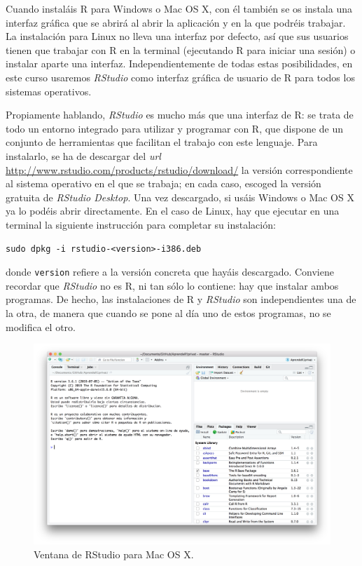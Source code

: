 \documentclass[]{book}
\theoremstyle{definition}
\theoremstyle{definition}
\theoremstyle{definition}
\theoremstyle{remark}
\begin{document}
Cuando instaláis R para Windows o Mac OS X, con él también se os instala una interfaz gráfica que se abrirá al abrir la aplicación y en la que podréis trabajar. La instalación para Linux no lleva una interfaz por defecto, así que sus usuarios tienen que trabajar con R en la terminal (ejecutando R para iniciar una sesión) o instalar aparte una interfaz. Independientemente de todas estas posibilidades, en este curso usaremos \emph{RStudio} como interfaz gráfica de usuario de R para todos los sistemas operativos.

Propiamente hablando, \emph{RStudio} es mucho más que una interfaz de R: se trata de todo un entorno integrado para utilizar y programar con R, que dispone de un conjunto de herramientas que facilitan el trabajo con este lenguaje. Para instalarlo, se ha de descargar del \emph{url} \url{http://www.rstudio.com/products/rstudio/download/} la versión correspondiente al sistema operativo en el que se trabaja; en cada caso, escoged la versión gratuita de \emph{RStudio Desktop}. Una vez descargado, si usáis Windows o Mac OS X ya lo podéis abrir directamente. En el caso de Linux, hay que ejecutar en una terminal la siguiente instrucción para completar su instalación:

\begin{verbatim}
sudo dpkg -i rstudio-<version>-i386.deb
\end{verbatim}

donde \texttt{version} refiere a la versión concreta que hayáis descargado. Conviene recordar que \emph{RStudio} no es R, ni tan sólo lo contiene: hay que instalar ambos programas. De hecho, las instalaciones de R y \emph{RStudio} son independientes una de la otra, de manera que cuando se pone al día uno de estos programas, no se modifica el otro.

\begin{figure}

{\centering \includegraphics[width=0.8\linewidth]{AprendeR-Parte-I_files/figure-html/rstudio1} 

}

\caption{Ventana de RStudio para Mac OS X.}\label{fig:rstudio1}
\end{figure}
\end{document}
